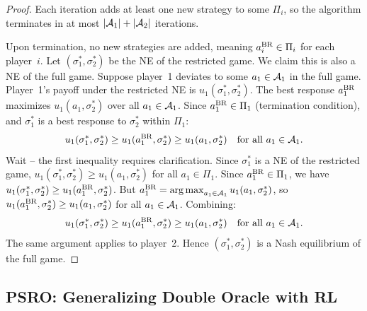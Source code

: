 \documentclass[11pt,a4paper]{article}
\begin{document}
\begin{proof}
Each iteration adds at least one new strategy to some $\Pi_i$, so the
algorithm terminates in at most $|\mathcal{A}_1| + |\mathcal{A}_2|$ iterations.

Upon termination, no new strategies are added, meaning
$a_i^{\mathrm{BR}} \in \Pi_i$ for each player~$i$.  Let $(\sigma_1^*, \sigma_2^*)$
be the NE of the restricted game.  We claim this is also a NE of the
full game.  Suppose player~1 deviates to some $a_1 \in \mathcal{A}_1$
in the full game.  Player~1's payoff under the restricted NE is
$u_1(\sigma_1^*, \sigma_2^*)$.  The best response $a_1^{\mathrm{BR}}$ maximizes
$u_1(a_1, \sigma_2^*)$ over all $a_1 \in \mathcal{A}_1$.  Since
$a_1^{\mathrm{BR}} \in \Pi_1$ (termination condition), and $\sigma_1^*$ is
a best response to $\sigma_2^*$ within $\Pi_1$:
\[
  u_1(\sigma_1^*, \sigma_2^*)
  \ge u_1(a_1^{\mathrm{BR}}, \sigma_2^*)
  \ge u_1(a_1, \sigma_2^*)
  \quad \text{for all } a_1 \in \mathcal{A}_1.
\]
Wait -- the first inequality requires clarification. Since $\sigma_1^*$
is a NE of the restricted game, $u_1(\sigma_1^*, \sigma_2^*) \ge
u_1(a_1, \sigma_2^*)$ for all $a_1 \in \Pi_1$.  Since
$a_1^{\mathrm{BR}} \in \Pi_1$, we have
$u_1(\sigma_1^*, \sigma_2^*) \ge u_1(a_1^{\mathrm{BR}}, \sigma_2^*)$.  But
$a_1^{\mathrm{BR}} = \operatorname{arg\,max}_{a_1 \in \mathcal{A}_1} u_1(a_1, \sigma_2^*)$, so
$u_1(a_1^{\mathrm{BR}}, \sigma_2^*) \ge u_1(a_1, \sigma_2^*)$ for all
$a_1 \in \mathcal{A}_1$.  Combining:
\[
  u_1(\sigma_1^*, \sigma_2^*) \ge u_1(a_1^{\mathrm{BR}}, \sigma_2^*)
  \ge u_1(a_1, \sigma_2^*)
  \quad \text{for all } a_1 \in \mathcal{A}_1.
\]
The same argument applies to player~2.  Hence $(\sigma_1^*, \sigma_2^*)$
is a Nash equilibrium of the full game.
\end{proof}

\subsection{PSRO: Generalizing Double Oracle with RL}
\end{document}
